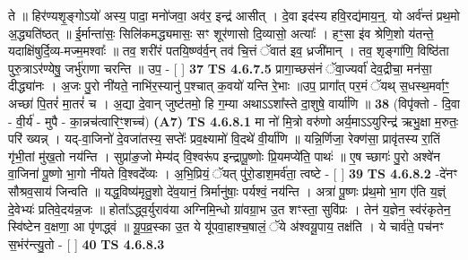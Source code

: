 \documentclass[17pt]{extarticle}
\begin{document}
                  ते ॥ हिर॑ण्यशृ॒ङ्गोऽयो॑ अस्य॒ पादा॒ मनो॑जवा॒ अव॑र॒ इन्द्र॑ आसीत् । दे॒वा इद॑स्य हवि॒रद्य॑माय॒न्॒. यो अर्व॑न्तं प्रथ॒मो अ॒द्ध्यति॑ष्ठत् ॥ ई॒र्मान्ता॑सः॒ सिलि॑कमद्ध्यमासः॒ सꣳ शूर॑णासो दि॒व्यासो॒ अत्याः᳚ । हꣳ॒॒सा इ॑व श्रेणि॒शो य॑तन्ते॒ यदाक्षि॑षुर्दि॒व्य-मज्म॒मश्वाः᳚ ॥ तव॒ शरी॑रं पतयि॒ष्ण्व॑र्व॒न् तव॑ चि॒त्तं ॅवात॑ इव॒ ध्रजी॑मान् । तव॒ शृङ्गा॑णि॒ विष्ठि॑ता पुरु॒त्राऽर॑ण्येषु॒ जर्भु॑राणा चरन्ति ॥ उप॒ - [  ] \textbf{  37} \newline
                  \newline
                                \textbf{ TS 4.6.7.5} \newline
                  प्रागा॒च्छस॑नं ॅवा॒ज्यर्वा॑ देव॒द्रीचा॒ मन॑सा॒ दीद्ध्या॑नः । अ॒जः पु॒रो नी॑यते॒ नाभि॑र॒स्यानु॑ प॒श्चात् क॒वयो॑ यन्ति रे॒भाः ॥उप॒ प्रागा᳚त् पर॒मं ॅयथ् स॒धस्थ॒मर्वाꣳ॒॒ अच्छा॑ पि॒तरं॑ मा॒तरं॑ च । अ॒द्या दे॒वान् जुष्ट॑तमो॒ हि ग॒म्या अथाऽऽशा᳚स्ते दा॒शुषे॒ वार्या॑णि ॥ \textbf{  38} \newline
                  \newline
                      (विपृ॑क्तो - दि॒वा - वी॒र्य॑ - मुपै - का॒न्नच॑त्वारिꣳ॒॒शच्च॑)  \textbf{(A7)} \newline \newline
                                        \textbf{ TS 4.6.8.1} \newline
                  मा नो॑ मि॒त्रो वरु॑णो अर्य॒माऽऽयुरिन्द्र॑ ऋभु॒क्षा म॒रुतः॒ परि॑ ख्यन्न् । यद्-वा॒जिनो॑ दे॒वजा॑तस्य॒ सप्तेः᳚ प्रव॒क्ष्यामो॑ वि॒दथे॑ वी॒र्या॑णि ॥ यन्नि॒र्णिजा॒ रेक्ण॑सा॒ प्रावृ॑तस्य रा॒तिं गृ॑भी॒तां मु॑ख॒तो नय॑न्ति । सुप्रा॑ङ॒जो मेम्य॑द् वि॒श्वरू॑प इन्द्रापू॒ष्णोः प्रि॒यमप्ये॑ति॒ पाथः॑ ॥ ए॒ष च्छागः॑ पु॒रो अश्वे॑न वा॒जिना॑ पू॒ष्णो भा॒गो नी॑यते वि॒श्वदे᳚व्यः । अ॒भि॒प्रियं॒ ॅयत् पु॑रो॒डाश॒मर्व॑ता॒ त्वष्टे - [  ] \textbf{  39} \newline
                  \newline
                                \textbf{ TS 4.6.8.2} \newline
                  -दे॑नꣳ सौश्रव॒साय॑ जिन्वति ॥ यद्ध॒विष्य॑मृतु॒शो दे॑व॒यानं॒ त्रिर्मानु॑षाः॒ पर्यश्वं॒ नय॑न्ति । अत्रा॑ पू॒ष्णः प्र॑थ॒मो भा॒ग ए॑ति य॒ज्ञ्ं दे॒वेभ्यः॑ प्रतिवे॒दय॑न्न॒जः ॥ होता᳚ऽद्ध्व॒र्युराव॑या अग्निमि॒न्धो ग्रा॑वग्रा॒भ उ॒त शꣳस्ता॒ सुवि॑प्रः । तेन॑ य॒ज्ञेन॒ स्व॑रंकृतेन॒ स्वि॑ष्टेन व॒क्षणा॒ आ पृ॑णद्ध्वं ॥ यू॒प॒व्र॒स्का उ॒त ये यू॑पवा॒हाश्च॒षालं॒ ॅये अ॑श्वयू॒पाय॒ तक्ष॑ति । ये चार्व॑ते॒ पच॑नꣳ स॒भंर॑न्त्यु॒तो - [  ] \textbf{  40} \newline
                  \newline
                                \textbf{ TS 4.6.8.3} \newline
\end{document}
